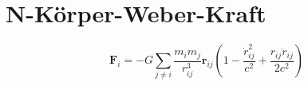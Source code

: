 \section{N-Körper-Weber-Kraft}
\[
\mathbf{F}_i = -G \sum_{j\neq i} \frac{m_i m_j}{r_{ij}^3} \mathbf{r}_{ij} \left(1 - \frac{\dot{r}_{ij}^2}{c^2} + \frac{r_{ij}\ddot{r}_{ij}}{2c^2}\right)
\]
